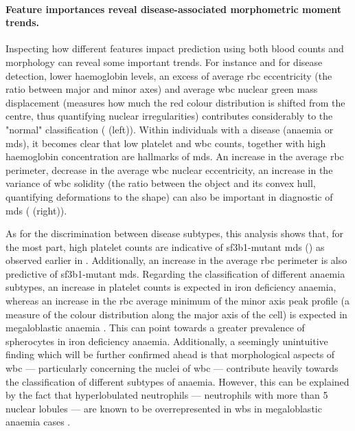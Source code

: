 \paragraph{Feature importances reveal disease-associated morphometric moment trends.} Inspecting how different features impact prediction using both blood counts and morphology can reveal some important trends. For instance and for disease detection, lower haemoglobin levels, an excess of average \ac{rbc} eccentricity (the ratio between major and minor axes) and average \ac{wbc} nuclear green mass displacement (measures how much the red colour distribution is shifted from the centre, thus quantifying nuclear irregularities) contributes considerably to the "normal" classification ( (left)). Within individuals with a disease (anaemia or \ac{mds}), it becomes clear that low platelet and \ac{wbc} counts, together with high haemoglobin concentration are hallmarks of \ac{mds}. An increase in the average \ac{rbc} perimeter, decrease in the average \ac{wbc} nuclear eccentricity, an increase in the variance of \ac{wbc} solidity (the ratio between the object and its convex hull, quantifying deformations to the shape) can also be important in diagnostic of \ac{mds} ( (right)).

\begin{figure}[!ht]
    \label{fig:feature-importance-disease-detection-classification}
\end{figure}

As for the discrimination between disease subtypes, this analysis shows that, for the most part, high platelet counts are indicative of \ac{sf3b1}-mutant \ac{mds} () as observed earlier in . Additionally, an increase in the average \ac{rbc} perimeter is also predictive of \ac{sf3b1}-mutant \ac{mds}. Regarding the classification of different anaemia subtypes, an increase in platelet counts is expected in iron deficiency anaemia, whereas an increase in the \ac{rbc} average minimum of the minor axis peak profile (a measure of the colour distribution along the major axis of the cell) is expected in megaloblastic anaemia . This can point towards a greater prevalence of spherocytes in iron deficiency anaemia. Additionally, a seemingly unintuitive finding which will be further confirmed ahead is that morphological aspects of \ac{wbc} --- particularly concerning the nuclei of \ac{wbc} --- contribute heavily towards the classification of different subtypes of anaemia. However, this can be explained by the fact that hyperlobulated neutrophils --- neutrophils with more than 5 nuclear lobules --- are known to be overrepresented in \ac{wbs} in megaloblastic anaemia cases \cite{Hariz2021-qw}.

